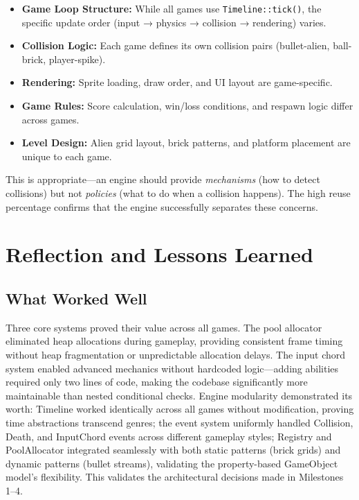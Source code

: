 \documentclass[12pt]{article}
\begin{document}
\begin{itemize}
  \item \textbf{Game Loop Structure:} While all games use \texttt{Timeline::tick()}, the specific update order (input → physics → collision → rendering) varies.
  \item \textbf{Collision Logic:} Each game defines its own collision pairs (bullet-alien, ball-brick, player-spike).
  \item \textbf{Rendering:} Sprite loading, draw order, and UI layout are game-specific.
  \item \textbf{Game Rules:} Score calculation, win/loss conditions, and respawn logic differ across games.
  \item \textbf{Level Design:} Alien grid layout, brick patterns, and platform placement are unique to each game.
\end{itemize}

This is appropriate—an engine should provide \emph{mechanisms} (how to detect collisions) but not \emph{policies} (what to do when a collision happens). The high reuse percentage confirms that the engine successfully separates these concerns.


\section{Reflection and Lessons Learned}

\subsection{What Worked Well}

Three core systems proved their value across all games. The pool allocator eliminated heap allocations during gameplay, providing consistent frame timing without heap fragmentation or unpredictable allocation delays. The input chord system enabled advanced mechanics without hardcoded logic—adding abilities required only two lines of code, making the codebase significantly more maintainable than nested conditional checks. Engine modularity demonstrated its worth: Timeline worked identically across all games without modification, proving time abstractions transcend genres; the event system uniformly handled Collision, Death, and InputChord events across different gameplay styles; Registry and PoolAllocator integrated seamlessly with both static patterns (brick grids) and dynamic patterns (bullet streams), validating the property-based GameObject model's flexibility. This validates the architectural decisions made in Milestones 1--4.
\end{document}

